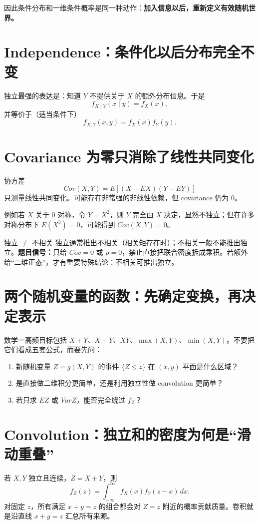 \documentclass[11pt,a4paper,openany]{ctexbook}
\newcommand{\key}[1]{\textbf{\color{deep}#1}}
\begin{document}
因此条件分布和一维条件概率是同一种动作：\key{加入信息以后，重新定义有效随机世界。}

\section{Independence：条件化以后分布完全不变}
独立最强的表达是：知道 $Y$ 不提供关于 $X$ 的额外分布信息。于是
\[
f_{X\mid Y}(x\mid y)=f_X(x),
\]
并等价于（适当条件下）
\[
f_{X,Y}(x,y)=f_X(x)f_Y(y).
\]

\section{Covariance 为零只消除了线性共同变化}
协方差
\[
Cov(X,Y)=E[(X-EX)(Y-EY)]
\]
只测量线性共同变化。可能存在非常强的非线性依赖，但 covariance 仍为 0。

例如若 $X$ 关于 0 对称，令 $Y=X^2$，则 $Y$ 完全由 $X$ 决定，显然不独立；但在许多对称分布下 $E(X^3)=0$，可能得到 $Cov(X,Y)=0$。

\begin{boundarybox}{独立 $\neq$ 不相关}
独立通常推出不相关（相关矩存在时）；不相关一般不能推出独立。\textbf{题目信号：}只给 $Cov=0$ 或 $\rho=0$，禁止直接把联合密度拆成乘积。若额外给“二维正态”，才有重要特殊结论：不相关可推出独立。
\end{boundarybox}

\section{两个随机变量的函数：先确定变换，再决定表示}
数学一高频目标包括 $X+Y$、$X-Y$、$XY$、$\max(X,Y)$、$\min(X,Y)$。不要把它们看成五套公式，而要先问：
\begin{enumerate}
  \item 新随机变量 $Z=g(X,Y)$ 的事件 $\{Z\le z\}$ 在 $(x,y)$ 平面是什么区域？
  \item 是直接做二维积分更简单，还是利用独立性做 convolution 更简单？
  \item 若只求 $EZ$ 或 $VarZ$，能否完全绕过 $f_Z$？
\end{enumerate}

\section{Convolution：独立和的密度为何是“滑动重叠”}
若 $X,Y$ 独立且连续，$Z=X+Y$，则
\[
f_Z(z)=\int_{-\infty}^{\infty}f_X(x)f_Y(z-x)\,dx.
\]
对固定 $z$，所有满足 $x+y=z$ 的组合都会对 $Z=z$ 附近的概率贡献质量。卷积就是沿直线 $x+y=z$ 汇总所有来源。
\end{document}
